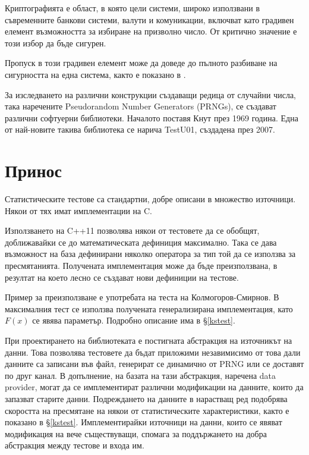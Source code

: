 \documentclass[12pt,a4paper]{article}
\theoremstyle{plain}
\begin{document}
    Криптографията е област, в която цели системи, широко използвани в съвременните банкови системи, валути и комуникации, включват като градивен елемент възможността за избиране на призволно число. \cite{AppCrypto} От критично значение е този избор да бъде сигурен.

    Пропуск в този градивен елемент може да доведе до пълното разбиване на сигурността на една система, както е показано в \cite{DissingMifare}.

    За изследването на различни конструкции създаващи редица от случайни числа, така наречените Pseudorandom Number Generators (PRNGs), се създават различни софтуерни библиотеки. Началото поставя Кнут през 1969 година. Една от най-новите такива библиотека се нарича TestU01, създадена през 2007. \cite{TestU01}

\section{Принос}

    Статистическите тестове са стандартни, добре описани в множество източници. \cite{KnuthV2} \cite{TestU01} Някои от тях имат имплементации на C.

    Използването на C++11 позволява някои от тестовете да се обобщят, доближавайки се до математическата дефиниция максимално. Така се дава възможност на база дефинирани няколко оператора за тип той да се използва за пресмятанията. Получената имплементация може да бъде преизползвана, в резултат на което лесно се създават нови дефиниции на тестове.

    Пример за преизползване е употребата на теста на Колмогоров-Смирнов. В максималния тест се използва получената генерализирана имплементация, като $F(x)$ се явява параметър. Подробно описание има в §\ref{kstest}.

    При проектирането на библиотеката е постигната абстракция на източникът на данни. Това позволява тестовете да бъдат приложими незавимисимо от това дали данните са записани във файл, генерират се динамично от PRNG или се доставят по друг канал. В допълнение, на базата на тази абстракция, наречена data provider, могат да се имплементират различни модификации на данните, които да запазват старите данни. Подреждането на данните в нарастващ ред подобрява скоростта на пресмятане на някои от статистическите характеристики, както е показано в §\ref{kstest}. Имплементирайки източници на данни, които се явяват модификация на вече съществуващи, спомага за поддържането на добра абстракция между тестове и входа им.
\end{document}
